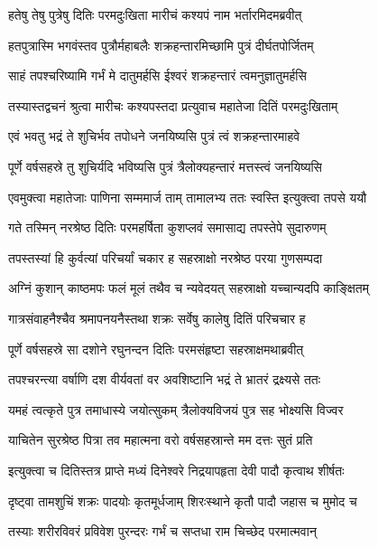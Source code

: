 
\twolineshloka
{हतेषु तेषु पुत्रेषु दितिः परमदुःखिता}
{मारीचं कश्यपं नाम भर्तारमिदमब्रवीत्} %

\twolineshloka
{हतपुत्रास्मि भगवंस्तव पुत्रौर्महाबलैः}
{शक्रहन्तारमिच्छामि पुत्रं दीर्घतपोर्जितम्} %

\twolineshloka
{साहं तपश्चरिष्यामि गर्भं मे दातुमर्हसि}
{ईश्वरं शक्रहन्तारं त्वमनुज्ञातुमर्हसि} %

\twolineshloka
{तस्यास्तद्वचनं श्रुत्वा मारीचः कश्यपस्तदा}
{प्रत्युवाच महातेजा दितिं परमदुःखिताम्} %

\twolineshloka
{एवं भवतु भद्रं ते शुचिर्भव तपोधने}
{जनयिष्यसि पुत्रं त्वं शक्रहन्तारमाहवे} %

\twolineshloka
{पूर्णे वर्षसहस्रे तु शुचिर्यदि भविष्यसि}
{पुत्रं त्रैलोक्यहन्तारं मत्तस्त्वं जनयिष्यसि} %

\twolineshloka
{एवमुक्त्वा महातेजाः पाणिना सम्ममार्ज ताम्}
{तामालभ्य ततः स्वस्ति इत्युक्त्वा तपसे ययौ} %

\twolineshloka
{गते तस्मिन् नरश्रेष्ठ दितिः परमहर्षिता}
{कुशप्लवं समासाद्य तपस्तेपे सुदारुणम्} %

\twolineshloka
{तपस्तस्यां हि कुर्वत्यां परिचर्यां चकार ह}
{सहस्राक्षो नरश्रेष्ठ परया गुणसम्पदा} %

\twolineshloka
{अग्निं कुशान् काष्ठमपः फलं मूलं तथैव च}
{न्यवेदयत् सहस्राक्षो यच्चान्यदपि काङ्क्षितम्} %

\twolineshloka
{गात्रसंवाहनैश्चैव श्रमापनयनैस्तथा}
{शक्रः सर्वेषु कालेषु दितिं परिचचार ह} %

\twolineshloka
{पूर्णे वर्षसहस्रे सा दशोने रघुनन्दन}
{दितिः परमसंहृष्टा सहस्राक्षमथाब्रवीत्} %

\twolineshloka
{तपश्चरन्त्या वर्षाणि दश वीर्यवतां वर}
{अवशिष्टानि भद्रं ते भ्रातरं द्रक्ष्यसे ततः} %

\twolineshloka
{यमहं त्वत्कृते पुत्र तमाधास्ये जयोत्सुकम्}
{त्रैलोक्यविजयं पुत्र सह भोक्ष्यसि विज्वर} %

\twolineshloka
{याचितेन सुरश्रेष्ठ पित्रा तव महात्मना}
{वरो वर्षसहस्रान्ते मम दत्तः सुतं प्रति} %

\twolineshloka
{इत्युक्त्वा च दितिस्तत्र प्राप्ते मध्यं दिनेश्वरे}
{निद्रयापहृता देवी पादौ कृत्वाथ शीर्षतः} %

\twolineshloka
{दृष्ट्वा तामशुचिं शक्रः पादयोः कृतमूर्धजाम्}
{शिरःस्थाने कृतौ पादौ जहास च मुमोद च} %

\twolineshloka
{तस्याः शरीरविवरं प्रविवेश पुरन्दरः}
{गर्भं च सप्तधा राम चिच्छेद परमात्मवान्} %

